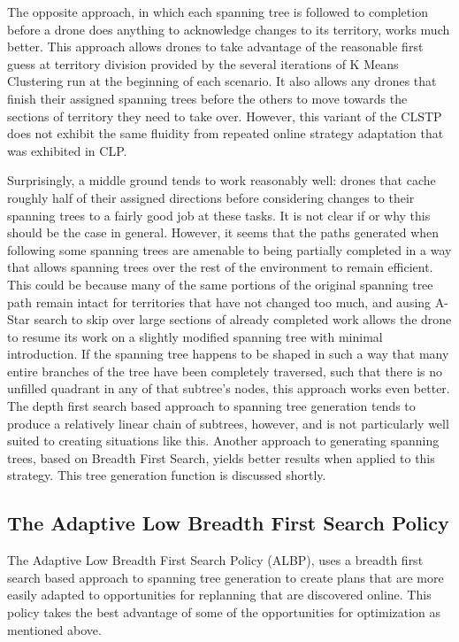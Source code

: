 The opposite approach, in which each spanning tree is followed to completion before a drone does anything to acknowledge changes to its territory, works much better. This approach allows drones to take advantage of the reasonable first guess at territory division provided by the several iterations of K Means Clustering run at the beginning of each scenario. It also allows any drones that finish their assigned spanning trees before the others to move towards the sections of territory they need to take over. However, this variant of the CLSTP does not exhibit the same fluidity from repeated online strategy adaptation that was exhibited in CLP.

Surprisingly, a middle ground tends to work reasonably well: drones that cache roughly half of their assigned directions before considering changes to their spanning trees to a fairly good job at these tasks. It is not clear if or why this should be the case in general. However, it seems that the paths generated when following some spanning trees are amenable to being partially completed in a way that allows spanning trees over the rest of the environment to remain efficient. This could be because many of the same portions of the original spanning tree path remain intact for territories that have not changed too much, and ausing A-Star search to skip over large sections of already completed work allows the drone to resume its work on a slightly modified spanning tree with minimal introduction. If the spanning tree happens to be shaped in such a way that many entire branches of the tree have been completely traversed, such that there is no unfilled quadrant in any of that subtree's nodes, this approach works even better. The depth first search based approach to spanning tree generation tends to produce a relatively linear chain of subtrees, however, and is not particularly well suited to creating situations like this. Another approach to generating spanning trees, based on Breadth First Search, yields better results when applied to this strategy. This tree generation function is discussed shortly.

\subsection{The Adaptive Low Breadth First Search Policy}

The Adaptive Low Breadth First Search Policy (ALBP), uses a breadth first search based approach to spanning tree generation to create plans that are more easily adapted to opportunities for replanning that are discovered online.
This policy takes the best advantage of some of the opportunities for optimization as mentioned above.

